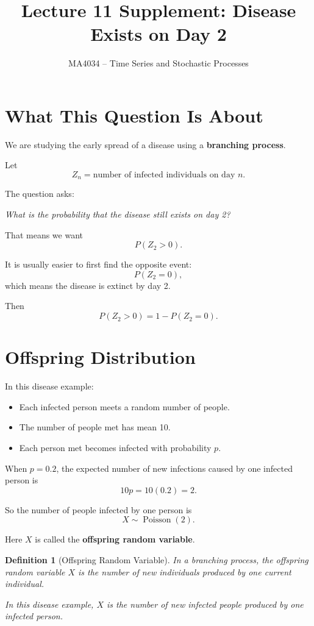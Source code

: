\documentclass[12pt]{article}
\title{Lecture 11 Supplement: Disease Exists on Day 2}
\author{MA4034 -- Time Series and Stochastic Processes}
\date{}
\newtheorem{definition}{Definition}
\begin{document}
\maketitle

\section{What This Question Is About}

We are studying the early spread of a disease using a \textbf{branching process}.

Let
\[
Z_n=\text{number of infected individuals on day }n.
\]

The question asks:

\begin{center}
\textit{What is the probability that the disease still exists on day 2?}
\end{center}

That means we want
\[
P(Z_2>0).
\]

It is usually easier to first find the opposite event:
\[
P(Z_2=0),
\]
which means the disease is extinct by day 2.

Then
\[
P(Z_2>0)=1-P(Z_2=0).
\]

\section{Offspring Distribution}

In this disease example:

\begin{itemize}
    \item Each infected person meets a random number of people.
    \item The number of people met has mean 10.
    \item Each person met becomes infected with probability \(p\).
\end{itemize}

When \(p=0.2\), the expected number of new infections caused by one infected person is
\[
10p=10(0.2)=2.
\]

So the number of people infected by one person is
\[
X\sim \operatorname{Poisson}(2).
\]

Here \(X\) is called the \textbf{offspring random variable}.

\begin{definition}[Offspring Random Variable]
In a branching process, the offspring random variable \(X\) is the number of new individuals produced by one current individual.

In this disease example, \(X\) is the number of new infected people produced by one infected person.
\end{definition}
\end{document}
